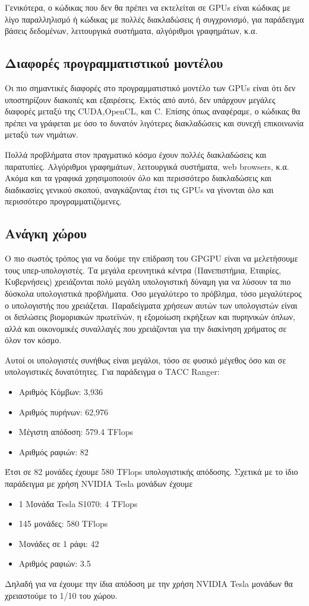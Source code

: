 Γενικότερα, ο κώδικας που δεν θα πρέπει να εκτελείται σε GPUs είναι κώδικας με λίγο παραλληλισμό ή κώδικας με πολλές διακλαδώσεις ή συγχρονισμό, για παράδειγμα βάσεις δεδομένων, λειτουργικά συστήματα, αλγόριθμοι γραφημάτων, κ.α.
\subsection{Διαφορές προγραμματιστικού μοντέλου}
Οι πιο σημαντικές διαφορές στο προγραμματιστικό μοντέλο των GPUs είναι ότι δεν υποστηρίζουν διακοπές και εξαιρέσεις. Εκτός από αυτό, δεν υπάρχουν μεγάλες διαφορές μεταξύ της CUDA,OpenCL, και C. Επίσης όπως αναφέραμε, ο κώδικας θα πρέπει να γράφεται με όσο το δυνατόν λιγότερες διακλαδώσεις και συνεχή επικοινωνία μεταξύ των νημάτων.

Πολλά προβλήματα στον πραγματικό κόσμο έχουν πολλές διακλαδώσεις και παρατυπίες. Αλγόριθμοι γραφημάτων, λειτουργικά συστήματα, web browsers, κ.α. Ακόμα και τα γραφικά χρησιμοποιούν όλο και περισσότερο διακλαδώσεις και διαδικασίες γενικού σκοπού, αναγκάζοντας έτσι τις GPUs να γίνονται όλο και περισσότερο προγραμματιζόμενες.


\subsection{Ανάγκη χώρου}
Ο πιο σωστός τρόπος για να δούμε την επίδραση του GPGPU είναι να μελετήσουμε τους υπερ-υπολογιστές. Τα μεγάλα ερευνητικά κέντρα (Πανεπιστήμια, Εταιρίες, Κυβερνήσεις) χρειάζονται πολύ μεγάλη υπολογιστική δύναμη για να λύσουν τα πιο δύσκολα υπολογιστικά προβλήματα. Όσο μεγαλύτερο το πρόβλημα, τόσο μεγαλύτερος ο υπολογιστής που χρειάζεται. Παραδείγματα χρήσεων αυτών των υπολογιστών είναι οι διπλώσεις βιομοριακών πρωτεϊνών, η εξομοίωση εκρήξεων και πυρηνικών όπλων, αλλά και οικονομικές συναλλαγές που χρειάζονται για την διακίνηση χρήματος σε όλον τον κόσμο.

Αυτοί οι υπολογιστές συνήθως είναι μεγάλοι, τόσο σε φυσικό μέγεθος όσο και σε υπολογιστικές δυνατότητες. Για παράδειγμα ο TACC Ranger:
\begin{itemize}
\item Αριθμός Κόμβων: 3,936
\item Αριθμός πυρήνων: 62,976
\item Μέγιστη απόδοση: 579.4 TFlops
\item Αριθμός ραφιών: 82
\end{itemize}

Έτσι σε 82 μονάδες έχουμε 580 TFlops υπολογιστικής απόδοσης. Σχετικά με το ίδιο παράδειγμα με χρήση NVIDIA Tesla μονάδων έχουμε
\begin{itemize}
\item 1 Μονάδα Tesla S1070: 4 TFlops
\item 145 μονάδες: 580 TFlops
\item Μονάδες σε 1 ράφι: 42
\item Αριθμός ραφιών: 3.5
\end{itemize}
Δηλαδή για να έχουμε την ίδια απόδοση με την χρήση NVIDIA Tesla μονάδων θα χρειαστούμε το 1/10 του χώρου.

